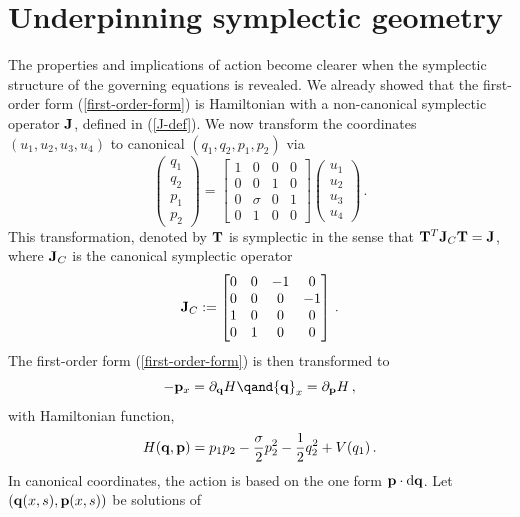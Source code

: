 \documentclass[10pt]{article}
\renewcommand{\theequation}{\arabic{section}.\arabic{equation}}
\def\rd{{\rm d}} \def\re{{\rm e}} \def\fr{\mbox{$\frac{1}{2}$}}
\renewcommand{\theequation}{\arabic{section}.\arabic{equation}}
\begin{document}
 \renewcommand{\theequation}{E-\arabic{equation}}

\section{Underpinning symplectic geometry}
\setcounter{equation}{0}
\label{sec-symplectic}


The properties and implications of action become clearer when the symplectic
structure of the governing equations is revealed.  We already showed that the
first-order form (\ref{first-order-form}) is Hamiltonian with a non-canonical
symplectic operator ${\bf J}$, defined in (\ref{J-def}). We now transform the coordinates $(u_1,u_2,u_3,u_4)$ to canonical $(q_1,q_2,p_1,p_2)$ via
  \[
  \begin{pmatrix} q_1\\ q_2 \\ p_1\\ p_2 \end{pmatrix}
  = \left[\begin{matrix} 1 & 0 & 0 & 0 \\ 0 & 0 & 1 & 0 \\
      0 & \sigma & 0 & 1 \\ 0 & 1 & 0 & 0 \end{matrix}\right]
  \begin{pmatrix} u_1\\ u_2 \\ u_3\\ u_4 \end{pmatrix}\,.
  \]
  This transformation, denoted by ${\bf T}$ is symplectic in the sense that
  ${\bf T}^T{\bf J}_C{\bf T} = {\bf J}$, where ${\bf J}_C$ is the canonical
  symplectic operator
  \[
  {\bf J}_C :=
  \left[\begin{matrix} 0 & 0 & -1 & 0 \\ 0 & 0 & 0 & -1 \\
      1 & 0 & 0 & 0 \\ 0 & 1 & 0 & 0 \end{matrix}\right]\,.
  \]
  The first-order form (\ref{first-order-form}) is then transformed to
  \begin{equation}\label{canon-ham}
  -{\bf p}_x= \partial_{\bf q}H \qand {\bf q}_x = \partial_{\bf p}H\,,
    \end{equation}
  with Hamiltonian function,
  \[
  H({\bf q},{\bf p}) = p_1p_2 - \frac{\sigma}{2}p_2^2 - \frac{1}{2} q_2^2 + V(q_1)\,.
  \]
  In canonical coordinates, the action is based on the one form ${\bf
  p}\cdot\rd{\bf q}$.  Let $({\bf q}(x,s),{\bf p}(x,s))$ be solutions of
\end{document}
